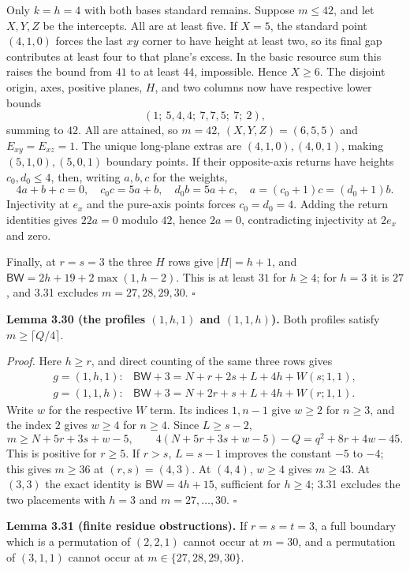 \documentclass[11pt]{article}
\begin{document}
Only $k=h=4$ with both bases standard remains.  Suppose $m\le42$,
and let $X,Y,Z$ be the intercepts.  All are at least five.
If $X=5$, the standard point $(4,1,0)$ forces the last $xy$ corner to
have height at least two, so its final gap contributes at least four
to that plane's excess.  In the basic resource sum this raises the
bound from $41$ to at least $44$, impossible.  Hence $X\ge6$.
The disjoint origin, axes, positive planes, $H$, and two columns now
have respective lower bounds
\[
 (1;\ 5,4,4;\ 7,7,5;\ 7;\ 2),
\]
summing to $42$.  All are attained, so $m=42$,
$(X,Y,Z)=(6,5,5)$ and $E_{xy}=E_{xz}=1$.
The unique long-plane extras are $(4,1,0),(4,0,1)$, making
$(5,1,0),(5,0,1)$ boundary points.  If their opposite-axis returns
have heights $c_0,d_0\le4$, then, writing $a,b,c$ for the weights,
\[
 4a+b+c=0,\quad c_0c=5a+b,\quad d_0b=5a+c,
 \quad a=(c_0+1)c=(d_0+1)b.
\]
Injectivity at $e_x$ and the pure-axis points forces $c_0=d_0=4$.
Adding the return identities gives $22a=0$ modulo $42$, hence $2a=0$,
contradicting injectivity at $2e_x$ and zero.

Finally, at $r=s=3$ the three $H$ rows give $|H|=h+1$, and
$\mathsf{BW}=2h+19+2\max(1,h-2)$.
This is at least $31$ for $h\ge4$; for $h=3$ it is $27$, and 3.31
excludes $m=27,28,29,30$. \ensuremath{\square}

\label{res:A3.7}
\textbf{Lemma 3.30 (the profiles $(1,h,1)$ and $(1,1,h)$).}
Both profiles satisfy $m\ge\lceil Q/4\rceil$.

\emph{Proof.}
Here $h\ge r$, and direct counting of the same three rows gives
\[
\begin{array}{ll}
g=(1,h,1):&\mathsf{BW}+3=N+r+2s+L+4h+W(s;1,1),\\
g=(1,1,h):&\mathsf{BW}+3=N+2r+s+L+4h+W(r;1,1).
\end{array}\tag{3.22}
\]
Write $w$ for the respective $W$ term.  Its indices $1,n-1$ give
$w\ge2$ for $n\ge3$, and the index $2$ gives $w\ge4$ for $n\ge4$.
Since $L\ge s-2$,
\[
 m\ge N+5r+3s+w-5,\qquad
 4(N+5r+3s+w-5)-Q=q^2+8r+4w-45.
\]
This is positive for $r\ge5$.  If $r>s$, $L=s-1$ improves the
constant $-5$ to $-4$; this gives $m\ge36$ at $(r,s)=(4,3)$.
At $(4,4)$, $w\ge4$ gives $m\ge43$.
At $(3,3)$ the exact identity is $\mathsf{BW}=4h+15$, sufficient for
$h\ge4$; 3.31 excludes the two placements with $h=3$ and $m=27,\ldots,30$.
\ensuremath{\square}

\label{res:A3.8}
\textbf{Lemma 3.31 (finite residue obstructions).}
If $r=s=t=3$, a full boundary which is a permutation of $(2,2,1)$
cannot occur at $m=30$, and a permutation of $(3,1,1)$ cannot occur at
$m\in\{27,28,29,30\}$.
\end{document}
